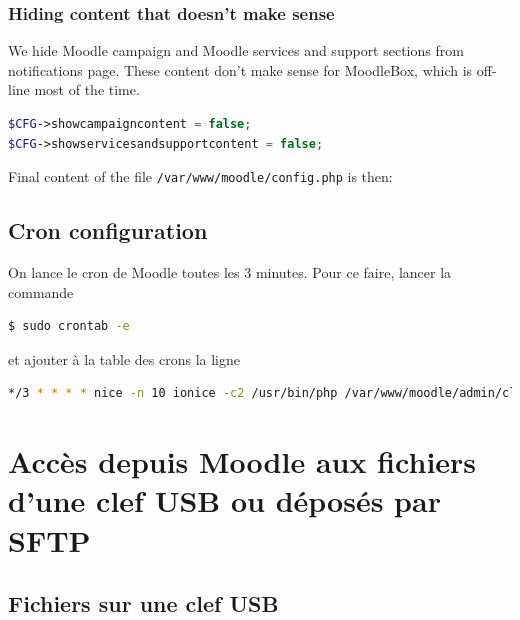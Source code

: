 \documentclass[12pt]{article}
\begin{document}
\subsubsection{Hiding content that doesn't make sense}

We hide Moodle campaign and Moodle services and support sections from notifications page.
These content don't make sense for MoodleBox, which is off-line most of the time.
\begin{lstlisting}[language=php]
$CFG->showcampaigncontent = false;
$CFG->showservicesandsupportcontent = false;
\end{lstlisting}

Final content of the file \lstinline{/var/www/moodle/config.php} is then:


%

\subsection{Cron configuration}

On lance le cron de Moodle toutes les 3 minutes.
Pour ce faire, lancer la commande

\begin{lstlisting}[language=bash]
$ sudo crontab -e
\end{lstlisting}

et ajouter à la table des crons la ligne
\begin{lstlisting}[language=bash]
*/3 * * * * nice -n 10 ionice -c2 /usr/bin/php /var/www/moodle/admin/cli/cron.php
\end{lstlisting}

\section{Accès depuis Moodle aux fichiers d'une clef USB ou déposés par SFTP}

\subsection{Fichiers sur une clef USB}
\end{document}
